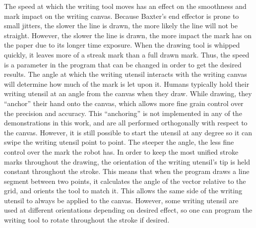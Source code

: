 \documentclass[letterpaper]{article}
\begin{document}
The speed at which the writing tool moves has an effect on the smoothness and mark impact on the writing canvas. Because Baxter's end effector is prone to small jitters, the slower the line is drawn, the more likely the line will not be straight. However, the slower the line is drawn, the more impact the mark has on the paper due to its longer time exposure. When the drawing tool is whipped quickly, it leaves more of a streak mark than a full drawn mark. Thus, the speed is a parameter in the program that can be changed in order to get the desired results. The angle at which the writing utensil interacts with the writing canvas will determine how much of the mark is let upon it. Humans typically hold their writing utensil at an angle from the canvas when they draw. While drawing, they ``anchor'' their hand onto the canvas, which allows more fine grain control over the precision and accuracy. This ``anchoring'' is not implemented in any of the demonstrations in this work, and are all performed orthogonally with respect to the canvas. However, it is still possible to start the utensil at any degree so it can swipe the writing utensil point to point. The steeper the angle, the less fine control over the mark the robot has. In order to keep the most unified stroke marks throughout the drawing, the orientation of the writing utensil's tip is held constant throughout the stroke. This means that when the program draws a line segment between two points, it calculates the angle of the vector relative to the grid, and orients the tool to match it. This allows the same side of the writing utensil to always be applied to the canvas. However, some writing utensil are used at different orientations depending on desired effect, so one can program the writing tool to rotate throughout the stroke if desired.
\end{document}
